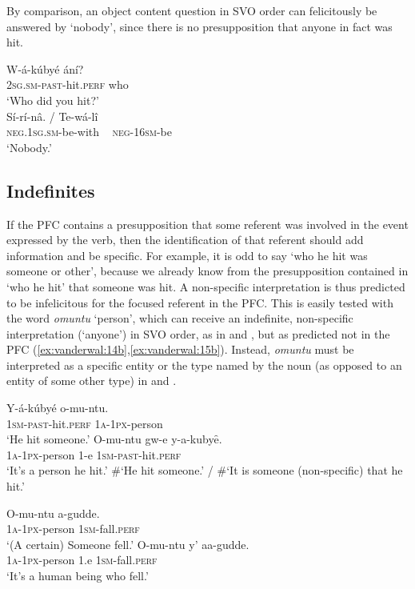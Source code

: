 \documentclass[output=paper]{langsci/langscibook}
\begin{document}
By comparison, an object content question in SVO order  can felicitously be answered by ‘nobody’, since there is no presupposition that anyone in fact was hit.

\ea\label{ex:vanderwal:13}
\gll W-á-kúbyé    ání?\\
     \textsc{2sg.sm-past}-hit.\textsc{perf}  who\\
\glt ‘Who did you hit?’\\{}
\gll Sí-rí-nâ.      /   Te-wá-lî\\
     \textsc{neg.1sg.sm}-be-with  ~  \textsc{neg-16sm}-be\\
\glt ‘Nobody.’
\z

\subsection{Indefinites}\label{sec:vanderwal:3.2} %

If the PFC contains a presupposition that some referent was involved in the event expressed by the verb, then the identification of that referent should add information and be specific. For example, it is odd to say ‘who he hit was someone or other’, because we already know from the presupposition contained in ‘who he hit’ that someone was hit. A non-specific interpretation is thus predicted to be infelicitous for the focused referent in the PFC. This is easily tested with the word \textit{omuntu} ‘person’, which can receive an indefinite, non-specific interpretation (‘anyone’) in SVO order, as in  and , but as predicted not in the PFC (\ref{ex:vanderwal:14b},\ref{ex:vanderwal:15b}). Instead, \textit{omuntu} must be interpreted as a specific entity or the type named by the noun (as opposed to an entity of some other type) in  and .

\ea\label{ex:vanderwal:14}
\ea\label{ex:vanderwal:14a}
\gll    Y-á-kúbyé    o-mu-ntu.\\
         \textsc{1sm-past}-hit.\textsc{perf}  \textsc{1a-1px}-person\\
\glt     ‘He hit someone.’
\ex\label{ex:vanderwal:14b}
\gll    O-mu-ntu    gw-e  y-a-kubyȇ.\\
         \textsc{1a-1px}-person  1-e  \textsc{1sm-past}-hit.\textsc{perf}\\
\glt     ‘It’s a person he hit.’ 
\glt     \#‘He hit someone.’ / \#‘It is someone (non-specific) that he hit.’
\z
\z

\ea\label{ex:vanderwal:15}
\ea\label{ex:vanderwal:15a}
\gll   O-mu-ntu    a-gudde.\\
         \textsc{1a-1px}-person  1\textsc{sm}-fall.\textsc{perf}\\
\glt     ‘(A certain) Someone fell.’
\ex\label{ex:vanderwal:15b}
\gll     O-mu-ntu    y’  aa-gudde.\\
         \textsc{1a-1px}-person  1.e  \textsc{1sm}-fall.\textsc{perf}\\
\glt     ‘It’s a human being who fell.’
\end{document}
